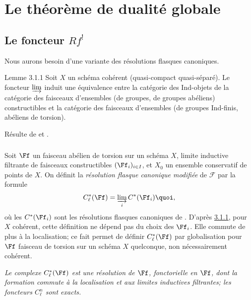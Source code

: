 \section{Le théorème de dualité globale}\pageoriginale 

\subsection{Le foncteur $Rf^{!}$}

Nous aurons besoin d'une variante des résolutions flasques canoniques.

\begin{enonce*}{Lemme 3.1.1}
Soit $X$ un schéma cohérent (\ie quasi-compact quasi-séparé). Le
foncteur $\varinjlim$ induit une équivalence entre la catégorie des
Ind-objets de la catégorie des faisceaux d'ensembles (\resp de
groupes, \resp de groupes abéliens) constructibles et la catégorie des
faisceaux d'ensembles (\resp de groupes Ind-finis, \resp abéliens de torsion).
\end{enonce*}

Résulte de  et .

\setcounter{subsubsection}{1}
\subsubsection{}
Soit $\Ff$ un faisceau abélien de torsion sur un schéma $X$,
limite inductive filtrante de faisceaux constructibles
$(\Ff_{i})_{i\in I}$, et $X_{0}$ un ensemble conservatif de
points de $X$. On définit la \emph{résolution flasque canonique
modifiée} de $\mathcal{F}$ par la formule
$$
C^{\ast}_{\ell}(\Ff)=\varinjlim_{i}C^{\ast}(\Ff_{i}){\quoi},
$$ où les $C^{\ast}(\Ff_{i})$ sont les résolutions flasques canoniques
de . D'après \hyperref[XVIII.lem3.1.1]{3.1.1}, pour $X$
cohérent, cette définition ne dépend pas du choix des $\Ff_{i}$. Elle
commute de plus à la localisation; ce fait permet de définir
$C^{\ast}_{\ell}(\Ff)$ par globalisation pour $\Ff$ faisceau de
torsion sur un schéma $X$ quelconque, non nécessairement cohérent.

\emph{Le complexe $C^{\ast}_{\ell}(\Ff)$ est une résolution de
$\Ff$, fonctorielle en $\Ff$, dont la formation
commute à la localisation et aux limites inductives filtrantes; les
foncteurs $C^{n}_{\ell}$ sont exacts.}

